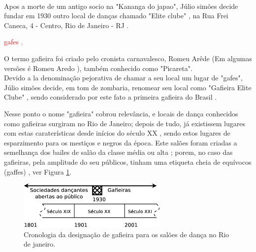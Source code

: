 ~\\
Apos a morte de um antigo socio na "Kananga do japao", Júlio simões decide fundar em 1930  
outro local de danças chamado "Elite clube" \cite[pp. 84]{cabral1996escolas} \cite[pp. 188]{raca1999},
na Rua Frei Caneca, 4 - Centro, Rio de Janeiro - RJ \cite{cabral2016elisete}.

\textcolor{red}{gafes \cite[pp. 188]{raca1999}.}


O termo gafieira foi criado pelo cronista carnavalesco, Romeu Arêde \cite[pp. 21]{efege1974maxixe} \cite[pp. 78]{coutinho2006cronistas}
(Em algumas versões é Romeu Aredo \cite[pp. 188]{raca1999}), 
também conhecido como "Picareta".
~\\


Devido a la denominação pejorativa de chamar a seu local um lugar de "gafes",
Júlio simões decide, em tom de zombaria, renomear seu local como "Gafieira Elite Clube" \cite[pp. 79]{moura1995tia},
sendo considerado por este fato a primeira gafieira do Brasil \cite{cabral2016elisete}.


Nesse ponto o nome "gafieira" cobrou relevância, e locais de dança conhecidos como gafieiras surgiram no Rio de Janeiro;
depois de tudo, já existissem lugares com estas caraterísticas desde inícios do século XX \cite[pp. 49]{diniz2003almanaque}, 
sendo estos lugares de esparzimento para os mestiços e negros da época.
Este salões foram criadas a semelhança dos bailes de salão da classe média ou alta \cite[pp. 78]{coutinho2006cronistas}; porem, no
caso das gafieiras, pela amplitude do seu públicos, tinham uma etiqueta cheia de equívocos (gaffes) \cite[pp. 49]{diniz2003almanaque},
ver Figura \ref{fig:gafieiracrono}.
\begin{figure}[h]
  \centering
    \includegraphics[width=0.65\textwidth]{chapters/cap-intro/gafieira-crono.eps}
  \caption{Cronologia da designação de gafieira para os salões de dança no Rio de janeiro.}
  \label{fig:gafieiracrono}
\end{figure}




